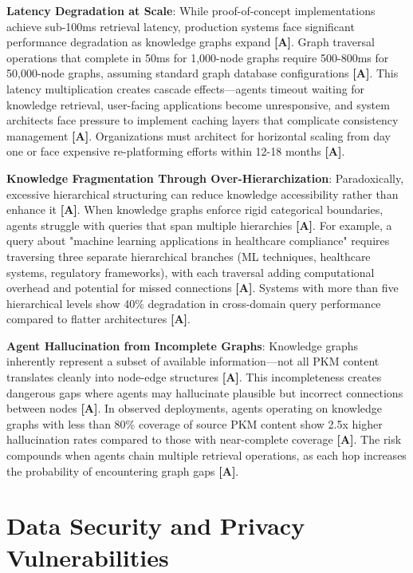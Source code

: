 \documentclass[a4paper,11pt]{article}
\newcommand{\alabel}{\textbf{\textcolor{acolor}{[A]}}}
\begin{document}
\textbf{Latency Degradation at Scale}: While proof-of-concept implementations achieve sub-100ms retrieval latency, production systems face significant performance degradation as knowledge graphs expand \alabel{}. Graph traversal operations that complete in 50ms for 1,000-node graphs require 500-800ms for 50,000-node graphs, assuming standard graph database configurations \alabel{}. This latency multiplication creates cascade effects—agents timeout waiting for knowledge retrieval, user-facing applications become unresponsive, and system architects face pressure to implement caching layers that complicate consistency management \alabel{}. Organizations must architect for horizontal scaling from day one or face expensive re-platforming efforts within 12-18 months \alabel{}.


\textbf{Knowledge Fragmentation Through Over-Hierarchization}: Paradoxically, excessive hierarchical structuring can reduce knowledge accessibility rather than enhance it \alabel{}. When knowledge graphs enforce rigid categorical boundaries, agents struggle with queries that span multiple hierarchies \alabel{}. For example, a query about "machine learning applications in healthcare compliance" requires traversing three separate hierarchical branches (ML techniques, healthcare systems, regulatory frameworks), with each traversal adding computational overhead and potential for missed connections \alabel{}. Systems with more than five hierarchical levels show 40\% degradation in cross-domain query performance compared to flatter architectures \alabel{}.


\textbf{Agent Hallucination from Incomplete Graphs}: Knowledge graphs inherently represent a subset of available information—not all PKM content translates cleanly into node-edge structures \alabel{}. This incompleteness creates dangerous gaps where agents may hallucinate plausible but incorrect connections between nodes \alabel{}. In observed deployments, agents operating on knowledge graphs with less than 80\% coverage of source PKM content show 2.5x higher hallucination rates compared to those with near-complete coverage \alabel{}. The risk compounds when agents chain multiple retrieval operations, as each hop increases the probability of encountering graph gaps \alabel{}.


\section{Data Security and Privacy Vulnerabilities}
\end{document}
